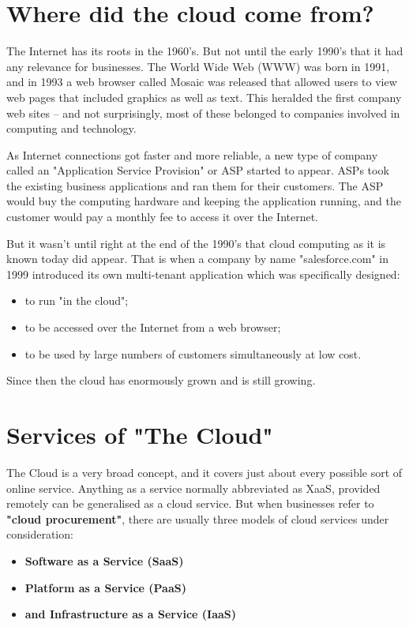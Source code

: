 \section{Where did the cloud come from?\cite{salesforce} }\label{sec:history}

The Internet has its roots in the 1960's. But not until the early 1990's that it had any relevance for businesses. The World Wide Web (WWW) was born in 1991, and in 1993 a web browser called Mosaic was released that allowed users to view web pages that included graphics as well as text. This heralded the first company web sites – and not surprisingly, most of these belonged to companies involved in computing and technology.

As Internet connections got faster and more reliable, a new type of company called an "Application Service Provision" or ASP started to appear. ASPs took the existing business applications and ran them for their customers. The ASP would buy the computing hardware and keeping the application running, and the customer would pay a monthly fee to access it over the Internet.

But it wasn't until right at the end of the 1990's that cloud computing as it is known today did appear. That is when a company by name "salesforce.com" in 1999 introduced its own multi-tenant application which was specifically designed:
\begin{itemize}
	\item to run "in the cloud";
	\item to be accessed over the Internet from a web browser;
	\item to be used by large numbers of customers simultaneously at low cost.
\end{itemize}
Since then the cloud has enormously grown and is still growing.

\section{Services of "The Cloud"\cite{IBMcloud}}\label{sec:service_models}
The Cloud is a very broad concept, and it covers just about every possible sort of online service. Anything as a service normally abbreviated as XaaS, provided remotely can be generalised as a cloud service. But when businesses refer to \textbf{"cloud procurement"}, there are usually three models of cloud services under consideration:
\begin{itemize}
	\item \textbf{Software as a Service (SaaS)}
	\item \textbf{Platform as a Service (PaaS)}
	\item \textbf{and Infrastructure as a Service (IaaS)}
\end{itemize}


